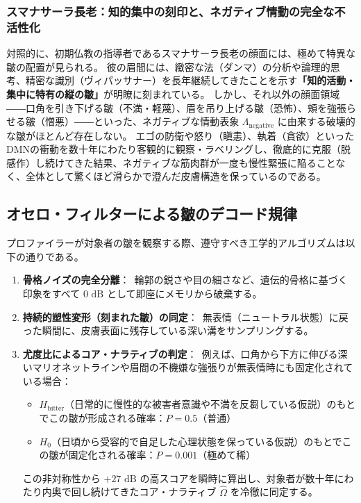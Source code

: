 \subsubsection{スマナサーラ長老：知的集中の刻印と、ネガティブ情動の完全な不活性化}
対照的に、初期仏教の指導者であるスマナサーラ長老の顔面には、極めて特異な皺の配置が見られる。
彼の眉間には、緻密な法（ダンマ）の分析や論理的思考、精密な識別（ヴィパッサナー）を長年継続してきたことを示す\textbf{「知的活動・集中に特有の縦の皺」}が明瞭に刻まれている。
しかし、それ以外の顔面領域――口角を引き下げる皺（不満・軽蔑）、眉を吊り上げる皺（恐怖）、頬を強張らせる皺（憎悪）――といった、ネガティブな情動表象 $\Lambda_{\mathrm{negative}}$ に由来する破壊的な皺がほとんど存在しない。
エゴの防衛や怒り（瞋恚）、執着（貪欲）といったDMNの衝動を数十年にわたり客観的に観察・ラベリングし、徹底的に克服（脱感作）し続けてきた結果、ネガティブな筋肉群が一度も慢性緊張に陥ることなく、全体として驚くほど滑らかで澄んだ皮膚構造を保っているのである。

\subsection{オセロ・フィルターによる皺のデコード規律}
プロファイラーが対象者の皺を観察する際、遵守すべき工学的アルゴリズムは以下の通りである。

\begin{enumerate}[label=(\arabic*)]
\item \textbf{骨格ノイズの完全分離}：\
輪郭の鋭さや目の細さなど、遺伝的骨格に基づく印象をすべて $0\text{ dB}$ として即座にメモリから破棄する。
\item \textbf{持続的塑性変形（刻まれた皺）の同定}：\
無表情（ニュートラル状態）に戻った瞬間に、皮膚表面に残存している深い溝をサンプリングする。
\item \textbf{尤度比によるコア・ナラティブの判定}：\
例えば、口角から下方に伸びる深いマリオネットラインや眉間の不機嫌な強張りが無表情時にも固定化されている場合：
\begin{itemize}
\item $H_{\mathrm{bitter}}$（日常的に慢性的な被害者意識や不満を反芻している仮説）のもとでこの皺が形成される確率：$P = 0.5$（普通）
\item $H_0$（日頃から受容的で自足した心理状態を保っている仮説）のもとでこの皺が固定化される確率：$P = 0.001$（極めて稀）
\end{itemize}
この非対称性から $+27\text{ dB}$ の高スコアを瞬時に算出し、対象者が数十年にわたり内奥で回し続けてきたコア・ナラティブ $\hat{\Omega}$ を冷徹に同定する。
\end{enumerate}

